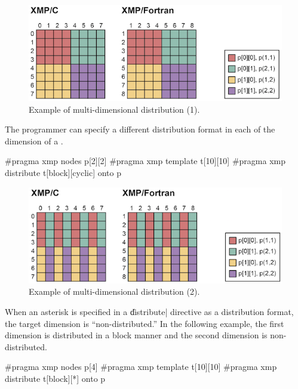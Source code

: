 \begin{figure}
  \centering
  \includegraphics{figs/multi.png}
  \caption{Example of multi-dimensional distribution (1).}
\end{figure}

The programmer can specify a different distribution format in each of
the dimension of a {\template}.

\begin{XCexample}
#pragma xmp nodes p[2][2]
#pragma xmp template t[10][10]
#pragma xmp distribute t[block][cyclic] onto p
\end{XCexample}


\begin{figure}
  \centering
  \includegraphics{figs/multi2.png}
  \caption{Example of multi-dimensional distribution (2).}
\end{figure}

When an asterisk is specified in a \|distribute| directive as
a distribution format, the target dimension is ``non-distributed.'' In
the following example, the first dimension is distributed in a
block manner and the second dimension is non-distributed.

\begin{XCexample}
#pragma xmp nodes p[4]
#pragma xmp template t[10][10]
#pragma xmp distribute t[block][*] onto p
\end{XCexample}

